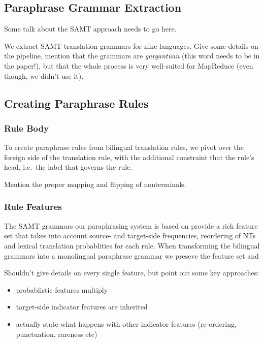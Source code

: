 \documentclass[11pt]{article}
\begin{document}
\subsection{Paraphrase Grammar Extraction} \label{extraction}

Some talk about the SAMT approach needs to go here. 

We extract SAMT translation grammars for nine languages. Give some
details on the pipeline, mention that the grammars are
\emph{gargantuan} (this word needs to be in the paper!), but that the
whole process is very well-suited for MapReduce (even though, we
didn't use it).

\subsection{Creating Paraphrase Rules} \label{rule_creation}

\subsubsection{Rule Body} \label{rule_body}

To create paraphrase rules from bilingual translation rules, we pivot
over the foreign side of the translation rule, with the additional
constraint that the rule's head, i.e.\ the label that governs the
rule.

Mention the proper mapping and flipping of nonterminals.

\subsubsection{Rule Features} \label{rule_features}

The SAMT grammars our paraphrasing system is based on provide a rich
feature set that takes into account source- and target-side
frequencies, reordering of NTs and lexical translation probablities
for each rule. When transforming the bilingual grammars into a
monolingual paraphrase grammar we preseve the feature set and

Shouldn't give details on every single feature, but point out some key
approaches:
\begin{itemize}
\item probablistic features multiply 
\item target-side indicator features are inherited
\item actually state what happens with other indicator features
  (re-ordering, punctuation, rareness etc)
\end{itemize}
\end{document}
